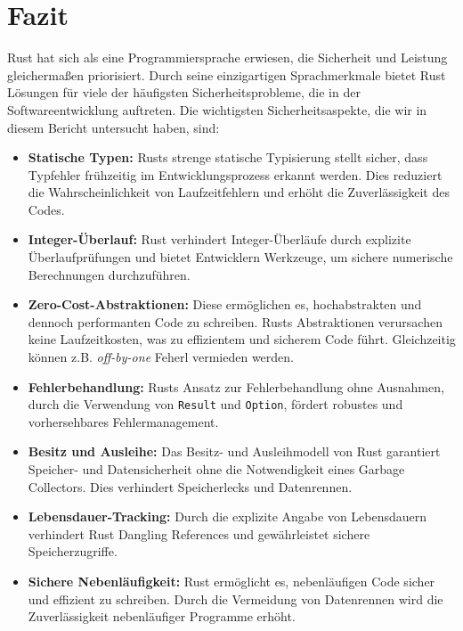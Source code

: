 \chapter{Fazit}

Rust hat sich als eine Programmiersprache erwiesen, die Sicherheit und Leistung gleichermaßen priorisiert. 
Durch seine einzigartigen Sprachmerkmale bietet Rust Lösungen für viele der häufigsten Sicherheitsprobleme, die in der Softwareentwicklung auftreten. 
Die wichtigsten Sicherheitsaspekte, die wir in diesem Bericht untersucht haben, sind:

\begin{itemize}
    \item \textbf{Statische Typen:} Rusts strenge statische Typisierung stellt sicher, dass Typfehler frühzeitig im Entwicklungsprozess erkannt werden. 
    Dies reduziert die Wahrscheinlichkeit von Laufzeitfehlern und erhöht die Zuverlässigkeit des Codes.
    
    \item \textbf{Integer-Überlauf:} Rust verhindert Integer-Überläufe durch explizite Überlaufprüfungen und bietet Entwicklern Werkzeuge, um sichere numerische Berechnungen durchzuführen.
    
    \item \textbf{Zero-Cost-Abstraktionen:} Diese ermöglichen es, hochabstrakten und dennoch performanten Code zu schreiben.
      Rusts Abstraktionen verursachen keine Laufzeitkosten, was zu effizientem und sicherem Code führt. Gleichzeitig können z.B. \textit{\gls{off-by-one}} Feherl vermieden werden.
    
    \item \textbf{Fehlerbehandlung:} Rusts Ansatz zur Fehlerbehandlung ohne Ausnahmen, durch die Verwendung von \texttt{Result} und \texttt{Option}, fördert robustes und vorhersehbares Fehlermanagement.
    
    \item \textbf{Besitz und Ausleihe:} Das Besitz- und Ausleihmodell von Rust garantiert Speicher- und Datensicherheit ohne die Notwendigkeit eines Garbage Collectors. 
    Dies verhindert Speicherlecks und Datenrennen.
    
    \item \textbf{Lebensdauer-Tracking:} Durch die explizite Angabe von Lebensdauern verhindert Rust Dangling References und gewährleistet sichere Speicherzugriffe.
    
    \item \textbf{Sichere Nebenläufigkeit:} Rust ermöglicht es, nebenläufigen Code sicher und effizient zu schreiben. 
    Durch die Vermeidung von Datenrennen wird die Zuverlässigkeit nebenläufiger Programme erhöht.
\end{itemize}
